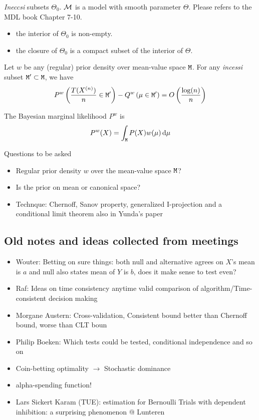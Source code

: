 \begin{define}
	\emph{Ineccsi} subsets $\Theta_0$. $\mathcal{M}$ is a model with smooth parameter $\Theta$. 
	Please refers to the MDL book Chapter 7-10.
	\begin{itemize}
		\item the interior of $\Theta_0$ is non-empty.
		\item the closure of $\Theta_0$ is a compact subset of the interior of $\Theta$.
	\end{itemize}
\end{define}


\begin{thm}
Let $w$ be any (regular) prior density over mean-value space $\mathtt{M}$.
For any \emph{incessi} subset $\mathtt{M}'\subset \mathtt{M}$, we have
\begin{equation*}
	P^{w} \left(\frac{T(X^{(n)})}{n} \in\Mt' \right) - Q^w\left(\mu \in \Mt'\right) 
	= O\left(\frac{\log(n)}{n}\right)
\end{equation*}
\end{thm}

The Bayesian marginal likelihood $P^{w}$ is
\begin{equation*}
	P^{w}(X) = \int_{\Mt} P(X) w(\mu) \dd{\mu}
\end{equation*}


Questions to be asked
\begin{itemize}
	\item Regular prior density $w$ over the mean-value space $\mathtt{M}$?
	\item Is the prior on mean or canonical space?
	\item Technque: Chernoff, Sanov property, generalized I-projection and
	a conditional limit theorem also in Yunda's paper
\end{itemize}


\subsection*{Old notes and ideas collected from meetings}
	
\begin{itemize}
	\item Wouter: Betting on sure things: both null and alternative agrees on $X$'s mean is $a$ and null also states mean of $Y$ is $b$, does it make sense to test even?
	\item Raf: Ideas on time consistency anytime valid comparison of algorithm/Time-consistent decision making
	\item Morgane Austern: Cross-validation, Consistent bound better than Chernoff bound, worse than CLT boun
	\item Philip Boeken: Which tests could be tested, conditional independence and so on
	\item Coin-betting optimality $\rightarrow$ Stochastic dominance
	\item alpha-spending function!
	\item Lars Sickert Karam (TUE): estimation for Bernoulli Trials with dependent inhibition: a surprising phenomenon @ Lunteren
\end{itemize}

